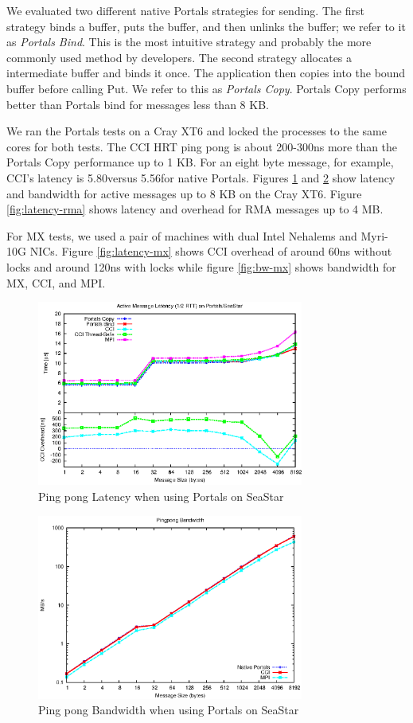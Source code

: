 We evaluated two different native Portals strategies for sending. The first strategy
binds a buffer, puts the buffer, and then unlinks the buffer; we refer to it as
\emph{Portals Bind}. This is the most intuitive strategy and probably the more
commonly used method by developers. The second strategy allocates a intermediate
buffer and binds it once. The application then copies into the bound buffer before
calling Put. We refer to this as \emph{Portals Copy}. Portals Copy performs better
than Portals bind for messages less than 8 KB.

We ran the Portals tests on a Cray XT6 and locked the processes to the same cores for
both tests. The CCI HRT ping pong is about 200-300ns more than the Portals Copy
performance up to 1 KB.  For an eight byte message, for example, CCI's latency is
5.80\us versus 5.56\us for native Portals.  Figures \ref{fig:latency-portals} and
\ref{fig:bw-portals} show latency and bandwidth for active messages up to 8 KB on the Cray
XT6. Figure \ref{fig:latency-rma} shows latency and overhead for RMA messages up to 4
MB.

For MX tests, we used a pair of machines with dual Intel Nehalems and Myri-10G NICs.
Figure \ref{fig:latency-mx} shows CCI overhead of around 60ns without locks and
around 120ns with locks while figure \ref{fig:bw-mx} shows bandwidth for MX, CCI, and
MPI.

\begin{figure}[htbp]
\centering
\includegraphics[width=3.45in]{pingpong-latency-portals-overhead-combined.eps}
\caption{Ping pong Latency when using Portals on SeaStar}
\label{fig:latency-portals}
\end{figure}

\begin{figure}[htbp]
\centering
\includegraphics[width=3.45in]{pingpong-bw.eps}
\caption{Ping pong Bandwidth when using Portals on SeaStar}
\label{fig:bw-portals}
\end{figure}

